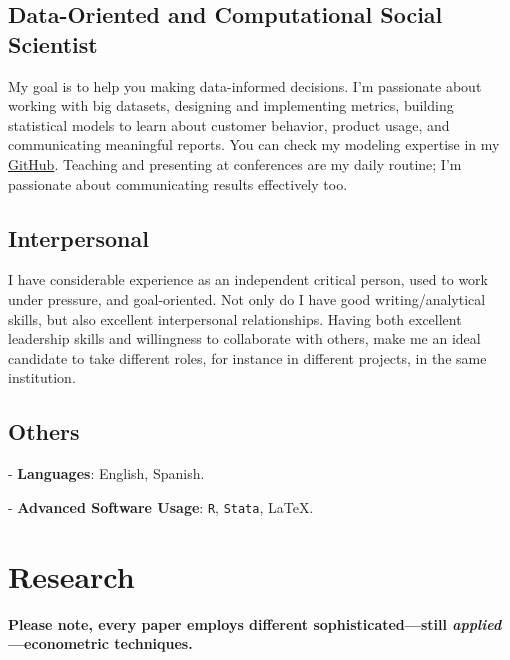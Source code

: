 \documentclass[letterpaper]{article}
\renewenvironment{itemize}{
  \begin{list}{}{
    \setlength{\leftmargin}{1.5em}
  }
}{
  \end{list}
}
\begin{document}
\subsection*{Data-Oriented and Computational Social Scientist}
My goal is to help you making data-informed decisions. 
I'm passionate about working with big datasets, designing and implementing metrics, building statistical models to learn about customer behavior, product usage, and communicating meaningful reports. You can check my modeling expertise in my \href{https://github.com/hbahamonde}{GitHub}. Teaching and presenting at conferences are my daily routine; I'm passionate about communicating results effectively too.







\subsection*{Interpersonal}
I have considerable experience as an independent critical person, used to work under pressure, and goal-oriented. Not only do I have good writing/analytical skills, but also excellent interpersonal relationships. Having both excellent leadership skills and willingness to collaborate with others, make me an ideal candidate to take different roles, for instance in different projects, in the same institution. 





\subsection*{Others}
\begin{itemize}
	\item- {\bf Languages}: English, Spanish.
	\item- {\bf Advanced Software Usage}: \texttt{R}, \texttt{Stata}, \LaTeX.
\end{itemize}


\section*{Research}

{\bf Please note, every paper employs different sophisticated---still \emph{applied}---econometric techniques.}
\end{document}
